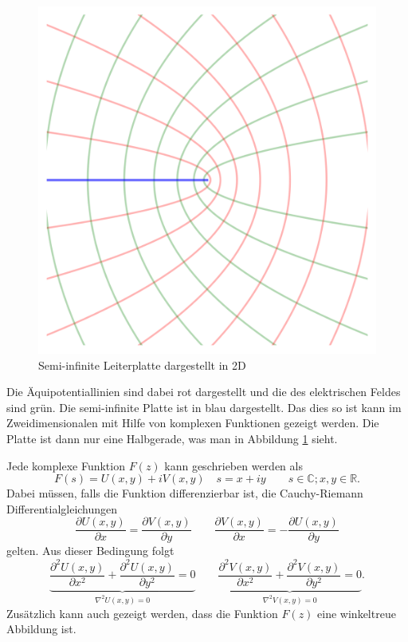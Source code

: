\begin{figure}
\begin{minipage}{.25\textwidth}
	\includegraphics[width=\textwidth]{papers/parzyl/img/Plane_2D.png}
	\caption{Semi-infinite Leiterplatte dargestellt in 2D}
	\label{parzyl:fig:leiterplatte_2d}
	\end{minipage}
\end{figure}
Die Äquipotentiallinien sind dabei rot dargestellt und die des elektrischen Feldes sind grün. Die semi-infinite Platte ist in blau dargestellt.
Das dies so ist kann im Zweidimensionalen mit Hilfe von komplexen Funktionen gezeigt werden. Die Platte ist dann nur eine Halbgerade, was man in Abbildung \ref{parzyl:fig:leiterplatte_2d} sieht.


Jede komplexe Funktion $F(z)$ kann geschrieben werden als
\begin{equation}
	F(s) = U(x,y) + iV(x,y) \quad s = x + iy \qquad s \in \mathbb{C}; x,y \in \mathbb{R}.
\end{equation}  
Dabei müssen, falls die Funktion differenzierbar ist, die Cauchy-Riemann Differentialgleichungen 
\begin{equation}
	\frac{\partial U(x,y)}{\partial x} 
	=
	\frac{\partial V(x,y)}{\partial y} 
	\qquad
	\frac{\partial V(x,y)}{\partial x}
	=
	-\frac{\partial U(x,y)}{\partial y}
\end{equation}
gelten.
Aus dieser Bedingung folgt 
\begin{equation}
	\label{parzyl_e_feld_zweite_ab}
	\underbrace{
	\frac{\partial^2 U(x,y)}{\partial x^2}
	+ 
	\frac{\partial^2 U(x,y)}{\partial y^2}
	=
	0
	}_{\displaystyle{\nabla^2U(x,y)=0}}
	\qquad
	\underbrace{
	\frac{\partial^2 V(x,y)}{\partial x^2}
	+
	\frac{\partial^2 V(x,y)}{\partial y^2}
	=
	0
	}_{\displaystyle{\nabla^2V(x,y) = 0}}.
\end{equation}
Zusätzlich kann auch gezeigt werden, dass die Funktion $F(z)$ eine winkeltreue Abbildung ist.

